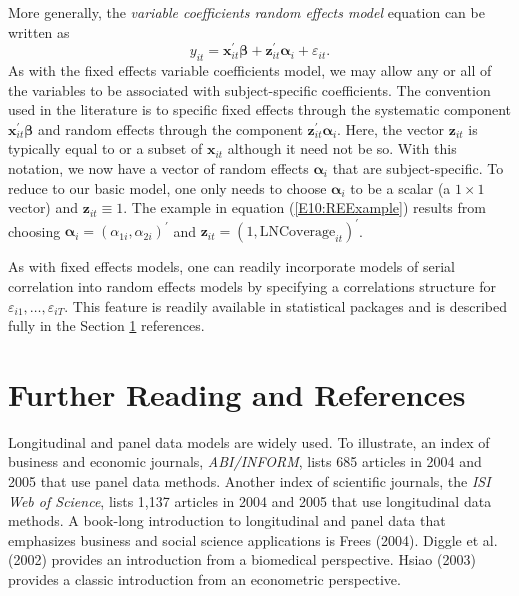More generally, the \emph{variable coefficients random effects
model} equation can be written as
\begin{equation}\label{E10:REModel}
y_{it} = \mathbf{x}_{it}^{\prime} \boldsymbol \beta +
\mathbf{z}_{it}^{\prime} \boldsymbol \alpha _i + \varepsilon_{it}.
\end{equation}
As with the fixed effects variable coefficients model, we may allow
any or all of the variables to be associated with subject-specific
coefficients. The convention used in the literature is to specific
fixed effects through the systematic component
$\mathbf{x}_{it}^{\prime} \boldsymbol \beta$ and random effects
through the component $\mathbf{z}_{it}^{\prime} \boldsymbol \alpha
_i$. Here, the vector $\mathbf{z}_{it}$ is typically equal to or a
subset of $\mathbf{x}_{it}$ although it need not be so. With this
notation, we now have a vector of random effects $\boldsymbol \alpha
_i$ that are subject-specific. To reduce to our basic model, one
only needs to choose $\boldsymbol \alpha _i$ to be a scalar (a $1
\times 1$ vector) and $\mathbf{z}_{it}\equiv 1.$ The example in
equation (\ref{E10:REExample}) results from choosing $\boldsymbol
\alpha _i = (\alpha_{1i}, \alpha_{2i})^{\prime}$ and
$\mathbf{z}_{it} = (1, \mathrm{LNCoverage}_{it})^{\prime}$.

As with fixed effects models, one can readily incorporate models of
serial correlation into random effects models by specifying a
correlations structure for $\varepsilon_{i1}, \ldots,
\varepsilon_{iT}$. This feature is readily available in statistical
packages and is described fully in the Section \ref{S10:References}
references.



\section{Further Reading and References}\label{S10:References}

Longitudinal and panel data models are widely used. To illustrate,
an index of business and economic journals, \textit{ABI/INFORM},
lists 685 articles in 2004 and 2005 that use panel data methods.
Another index of scientific journals, the \textit{ISI Web of
Science}, lists 1,137 articles in 2004 and 2005 that use
longitudinal data methods. A book-long introduction to longitudinal
and panel data that emphasizes business and social science
applications is Frees (2004). Diggle et al. (2002) provides an
introduction from a biomedical perspective. Hsiao (2003) provides a
classic introduction from an econometric perspective.

